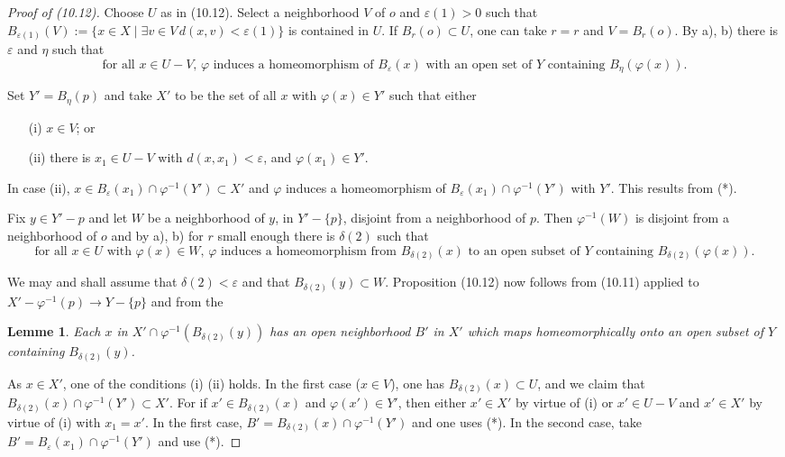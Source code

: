 \documentclass[12pt,a4paper]{article}
\theoremstyle{plain}
\newtheorem{lemma}[theorem]{Lemme}
\theoremstyle{definition}
\theoremstyle{remark}
\begin{document}
\begin{proof}[Proof of (10.12)]
Choose $U$ as in (10.12). Select a neighborhood $V$ of $o$ and $\varepsilon(1) > 0$ such that $B_{\varepsilon(1)}(V) := \{x \in X \mid \exists v \in V \, d(x, v) < \varepsilon(1)\}$ is contained in $U$. If $B_r(o) \subset U$, one can take $r = r$ and $V = B_r(o)$. By a), b) there is $\varepsilon$ and $\eta$ such that
\begin{equation*}
\tag{*} \text{for all } x \in U - V, \, \varphi \text{ induces a homeomorphism of } B_\varepsilon(x) \text{ with an open set of } Y \text{ containing } B_\eta(\varphi(x)).
\end{equation*}

Set $Y' = B_\eta(p)$ and take $X'$ to be the set of all $x$ with $\varphi(x) \in Y'$ such that either
\begin{enumerate}
\item[(i)] $x \in V$; or
\item[(ii)] there is $x_1 \in U - V$ with $d(x, x_1) < \varepsilon$, and $\varphi(x_1) \in Y'$.
\end{enumerate}

In case (ii), $x \in B_\varepsilon(x_1) \cap \varphi^{-1}(Y') \subset X'$ and $\varphi$ induces a homeomorphism of $B_\varepsilon(x_1) \cap \varphi^{-1}(Y')$ with $Y'$. This results from (*).

Fix $y \in Y' - p$ and let $W$ be a neighborhood of $y$, in $Y' - \{p\}$, disjoint from a neighborhood of $p$. Then $\varphi^{-1}(W)$ is disjoint from a neighborhood of $o$ and by a), b) for $r$ small enough there is $\delta(2)$ such that
\begin{equation*}
\tag{**} \text{for all } x \in U \text{ with } \varphi(x) \in W, \, \varphi \text{ induces a homeomorphism from } B_{\delta(2)}(x) \text{ to an open subset of } Y \text{ containing } B_{\delta(2)}(\varphi(x)).
\end{equation*}

We may and shall assume that $\delta(2) < \varepsilon$ and that $B_{\delta(2)}(y) \subset W$. Proposition (10.12) now follows from (10.11) applied to $X' - \varphi^{-1}(p) \to Y - \{p\}$ and from the

\begin{lemma}
\label{10.12.1}
Each $x$ in $X' \cap \varphi^{-1}(B_{\delta(2)}(y))$ has an open neighborhood $B'$ in $X'$ which maps homeomorphically onto an open subset of $Y$ containing $B_{\delta(2)}(y)$.
\end{lemma}

As $x \in X'$, one of the conditions (i) (ii) holds. In the first case ($x \in V$), one has $B_{\delta(2)}(x) \subset U$, and we claim that $B_{\delta(2)}(x) \cap \varphi^{-1}(Y') \subset X'$. For if $x' \in B_{\delta(2)}(x)$ and $\varphi(x') \in Y'$, then either $x' \in X'$ by virtue of (i) or $x' \in U - V$ and $x' \in X'$ by virtue of (i) with $x_1 = x'$. In the first case, $B' = B_{\delta(2)}(x) \cap \varphi^{-1}(Y')$ and one uses (*). In the second case, take $B' = B_\varepsilon(x_1) \cap \varphi^{-1}(Y')$ and use (*).
\end{proof}
\end{document}
